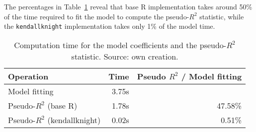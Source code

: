 \documentclass[
  10pt,
  letterpaper,
]{article}
\newenvironment{Shaded}{\begin{snugshade}}{\end{snugshade}}
\newcommand{\AttributeTok}[1]{\textcolor[rgb]{0.40,0.45,0.13}{#1}}
\newcommand{\DecValTok}[1]{\textcolor[rgb]{0.68,0.00,0.00}{#1}}
\newcommand{\FunctionTok}[1]{\textcolor[rgb]{0.28,0.35,0.67}{#1}}
\newcommand{\NormalTok}[1]{\textcolor[rgb]{0.00,0.23,0.31}{#1}}
\newcommand{\OtherTok}[1]{\textcolor[rgb]{0.00,0.23,0.31}{#1}}
\newcommand{\SpecialCharTok}[1]{\textcolor[rgb]{0.37,0.37,0.37}{#1}}
\newcommand{\StringTok}[1]{\textcolor[rgb]{0.13,0.47,0.30}{#1}}
\begin{document}
\begin{Shaded}
\end{Shaded}

The percentages in Table~\ref{tbl-rsq} reveal that base R implementation
takes around 50\% of the time required to fit the model to compute the
pseudo-\(R^2\) statistic, while the \texttt{kendallknight}
implementation takes only 1\% of the model time.

\begin{longtable}[]{@{}lrr@{}}

\caption{\label{tbl-rsq}Computation time for the model coefficients and
the pseudo-\(R^2\) statistic. Source: own creation.}

\tabularnewline

\toprule\noalign{}
Operation & Time & Pseudo \(R^2\) / Model fitting \\
\midrule\noalign{}
\endhead
\bottomrule\noalign{}
\endlastfoot
Model fitting & 3.75s & \\
Pseudo-\(R^2\) (base R) & 1.78s & 47.58\% \\
Pseudo-\(R^2\) (kendallknight) & 0.02s & 0.51\% \\

\end{longtable}
\end{document}
